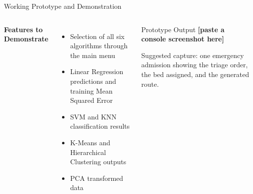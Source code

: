 \documentclass[aspectratio=169,11pt]{beamer}
\newcommand{\fillme}[1]{{\color{FillMe}\bfseries [#1]}}
\begin{document}
\begin{frame}{Working Prototype and Demonstration}

\begin{columns}[T,totalwidth=\textwidth]
\textbf{\color{GEUBlue}Features to Demonstrate}
\begin{itemize}\itemsep2pt
\footnotesize
\item Selection of all six algorithms through the main menu
\item Linear Regression predictions and training Mean Squared Error
\item SVM and KNN classification results
\item K-Means and Hierarchical Clustering outputs
\item PCA transformed data
\end{itemize}

\begin{block}{Prototype Output}
\centering
\vspace{4mm}
\fillme{paste a console screenshot here}
\vspace{2mm}

{\scriptsize\color{GEUGrey}Suggested capture: one emergency admission showing the triage order, the bed assigned, and the generated route.}
\vspace{4mm}
\end{block}
\end{columns}
\end{frame}
\end{document}
